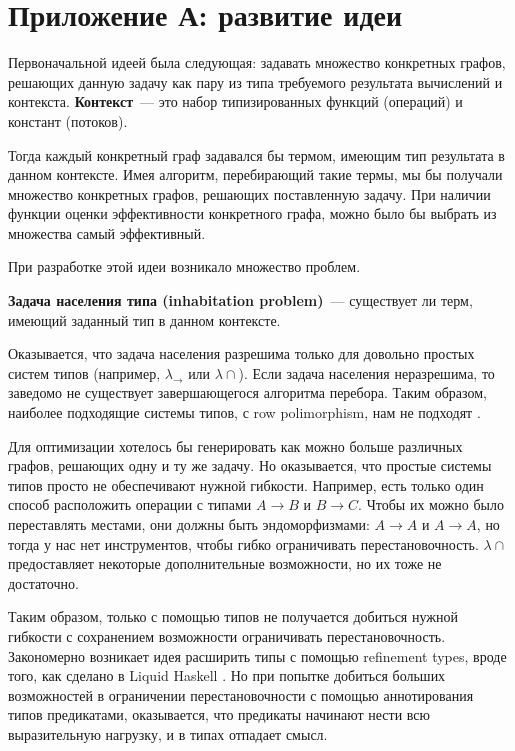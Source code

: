 \section*{Приложение А: развитие идеи}

Первоначальной идеей была следующая: задавать множество конкретных графов, решающих данную задачу как пару из типа требуемого результата вычислений и контекста.
\textbf{Контекст}~--- это набор типизированных функций (операций) и констант (потоков).

Тогда каждый конкретный граф задавался бы термом, имеющим тип результата в данном контексте.
Имея алгоритм, перебирающий такие термы, мы бы получали множество конкретных графов, решающих поставленную задачу.
При наличии функции оценки эффективности конкретного графа, можно было бы выбрать из множества самый эффективный.

При разработке этой идеи возникало множество проблем.

\textbf{Задача населения типа (inhabitation problem)}~--- существует ли терм, имеющий заданный тип в данном контексте.

Оказывается, что задача населения разрешима только для довольно простых систем типов (например, $\lambda_\rightarrow$ или $\lambda\cap$). Если задача населения неразрешима, то заведомо не существует завершающегося алгоритма перебора. Таким образом, наиболее подходящие системы типов, с row polimorphism, нам не подходят \cite{rowpoly}.

Для оптимизации хотелось бы генерировать как можно больше различных графов, решающих одну и ту же задачу. Но оказывается, что простые системы типов просто не обеспечивают нужной гибкости. Например, есть только один способ расположить операции с типами $A \rightarrow B \text{ и } B \rightarrow C$. Чтобы их можно было переставлять местами, они должны быть эндоморфизмами: $A \rightarrow A \text{ и } A \rightarrow A$, но тогда у нас нет инструментов, чтобы гибко ограничивать перестановочность. $\lambda\cap$ предоставляет некоторые дополнительные возможности, но их тоже не достаточно.

Таким образом, только с помощью типов не получается добиться нужной гибкости с сохранением возможности ограничивать перестановочность.
Закономерно возникает идея расширить типы с помощью refinement types, вроде того, как сделано в Liquid Haskell \cite{liquidhaskell}.
Но при попытке добиться больших возможностей в ограничении перестановочности с помощью аннотирования типов предикатами, оказывается, что предикаты начинают нести всю выразительную нагрузку, и в типах отпадает смысл.

